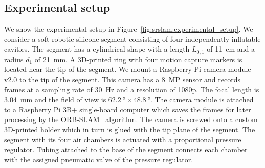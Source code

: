 \subsection{Experimental setup}
We show the experimental setup in Figure~\ref{fig:srslam:experimental_setup}.
We consider a soft robotic silicone segment consisting of four independently inflatable cavities. The segment has a cylindrical shape with a length $L_{0,1}$ of \SI{11}{cm} and a radius $d_1$ of \SI{21}{mm}. 
A 3D-printed ring with four motion capture markers is located near the tip of the segment.
%
We mount a Raspberry Pi camera module v2.0 to the tip of the segment.
This camera has a \SI{8}{MP} sensor and records frames at a sampling rate of \SI{30}{Hz} and a resolution of 1080p.
The focal length is \SI{3.04}{mm} and the field of view is $\SI{62.2}{\degree} \times \SI{48.8}{\degree}$.
The camera module is attached to a Raspberry Pi 3B+ single-board computer which saves the frames for later processing by the ORB-SLAM~\cite{mur2017orb} algorithm.
The camera is screwed onto a custom 3D-printed holder which in turn is glued with the tip plane of the segment.
%
The segment with its four air chambers is actuated with a proportional pressure regulator.
Tubing attached to the base of the segment connects each chamber with the assigned pneumatic valve of the pressure regulator.
%
